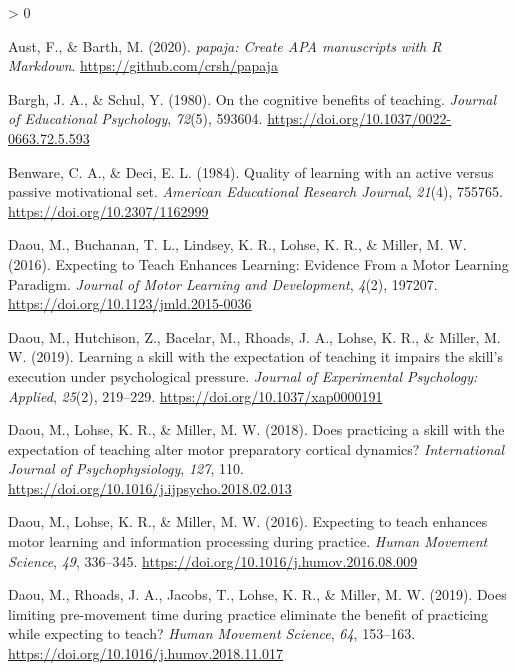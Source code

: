 \documentclass[
  english,
  man,floatsintext]{apa7}
\newlength{\cslhangindent}
\newenvironment{CSLReferences}[2] %
 {%
  \setlength{\parindent}{0pt}
  \ifodd #1 \everypar{\setlength{\hangindent}{\cslhangindent}}\ignorespaces\fi
  \ifnum #2 > 0
  \setlength{\parskip}{#2\baselineskip}
  \fi
 }%
 {}
\begin{document}
\hypertarget{refs}{}
\begin{CSLReferences}{1}{0}
\leavevmode\hypertarget{ref-R-papaja}{}%
Aust, F., \& Barth, M. (2020). \emph{{papaja}: {Create} {APA} manuscripts with {R Markdown}}. \url{https://github.com/crsh/papaja}

\leavevmode\hypertarget{ref-bargh1980}{}%
Bargh, J. A., \& Schul, Y. (1980). On the cognitive benefits of teaching. \emph{Journal of Educational Psychology}, \emph{72}(5), 593604. \url{https://doi.org/10.1037/0022-0663.72.5.593}

\leavevmode\hypertarget{ref-benware1984}{}%
Benware, C. A., \& Deci, E. L. (1984). Quality of learning with an active versus passive motivational set. \emph{American Educational Research Journal}, \emph{21}(4), 755765. \url{https://doi.org/10.2307/1162999}

\leavevmode\hypertarget{ref-daou2016}{}%
Daou, M., Buchanan, T. L., Lindsey, K. R., Lohse, K. R., \& Miller, M. W. (2016). Expecting to Teach Enhances Learning: Evidence From a Motor Learning Paradigm. \emph{Journal of Motor Learning and Development}, \emph{4}(2), 197207. \url{https://doi.org/10.1123/jmld.2015-0036}

\leavevmode\hypertarget{ref-daou2019}{}%
Daou, M., Hutchison, Z., Bacelar, M., Rhoads, J. A., Lohse, K. R., \& Miller, M. W. (2019). Learning a skill with the expectation of teaching it impairs the skill{'}s execution under psychological pressure. \emph{Journal of Experimental Psychology: Applied}, \emph{25}(2), 219--229. \url{https://doi.org/10.1037/xap0000191}

\leavevmode\hypertarget{ref-daou2018}{}%
Daou, M., Lohse, K. R., \& Miller, M. W. (2018). Does practicing a skill with the expectation of teaching alter motor preparatory cortical dynamics? \emph{International Journal of Psychophysiology}, \emph{127}, 110. \url{https://doi.org/10.1016/j.ijpsycho.2018.02.013}

\leavevmode\hypertarget{ref-daou2016a}{}%
Daou, M., Lohse, K. R., \& Miller, M. W. (2016). Expecting to teach enhances motor learning and information processing during practice. \emph{Human Movement Science}, \emph{49}, 336--345. \url{https://doi.org/10.1016/j.humov.2016.08.009}

\leavevmode\hypertarget{ref-daou2019a}{}%
Daou, M., Rhoads, J. A., Jacobs, T., Lohse, K. R., \& Miller, M. W. (2019). Does limiting pre-movement time during practice eliminate the benefit of practicing while expecting to teach? \emph{Human Movement Science}, \emph{64}, 153--163. \url{https://doi.org/10.1016/j.humov.2018.11.017}


\end{CSLReferences}
\end{document}
